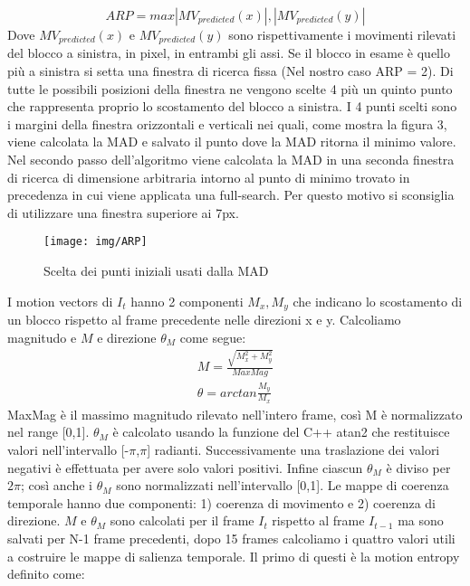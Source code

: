 \documentclass[12pt,oneside]{IEEEtran}
\begin{document}
			\begin{equation}
			ARP = max{|MV_{predicted}(x)|,|MV_{predicted}(y)|}
			\end{equation}
			Dove $MV_{predicted}(x)$ e $MV_{predicted}(y)$ sono rispettivamente i movimenti rilevati del blocco a sinistra, in pixel, in entrambi gli assi. Se il blocco in esame è quello più a sinistra si setta una finestra di ricerca fissa (Nel nostro caso ARP = 2). Di tutte le possibili posizioni della finestra ne vengono scelte 4 più un quinto punto che rappresenta proprio lo scostamento del blocco a sinistra. I 4 punti scelti sono i margini della finestra orizzontali e verticali nei quali, come mostra la figura 3, viene calcolata la MAD e salvato il punto dove la MAD ritorna il minimo valore.\newline
			Nel secondo passo dell'algoritmo viene calcolata la MAD in una seconda finestra di ricerca di dimensione arbitraria intorno al punto di minimo trovato in precedenza in cui viene applicata una full-search. Per questo motivo si sconsiglia di utilizzare una finestra superiore ai 7px.
			\begin{figure}[h]
			\caption{Scelta dei punti iniziali usati dalla MAD}
			\begin{center}
			\texttt{[image: img/ARP]}
			\end{center}
			\end{figure}
			I motion vectors di $I_t$ hanno 2 componenti $M_x,M_y$ che indicano lo scostamento di un blocco rispetto al frame precedente nelle direzioni x e y. Calcoliamo magnitudo e $M$ e direzione $\theta_M$ come segue:\newline
			\begin{equation}
			\begin{aligned}
				M = \frac{\sqrt{M_x^2+M_y^2}}{MaxMag} \\
				\theta = arctan \frac{M_y}{M_x}
			\end{aligned}
			\end{equation}
			MaxMag è il massimo magnitudo rilevato nell'intero frame, così M è normalizzato nel range [0,1]. $\theta_M$ è calcolato usando la funzione del C++ atan2 che restituisce valori nell'intervallo [-$\pi$,$\pi$] radianti. Successivamente una traslazione dei valori negativi è effettuata per avere solo valori positivi. Infine ciascun $\theta_M$ è diviso per $2\pi$; così anche i $\theta_M$ sono normalizzati nell'intervallo [0,1].\newline
			Le mappe di coerenza temporale hanno due componenti: 1) coerenza di movimento e 2) coerenza di direzione. $M$ e $\theta_M$ sono calcolati per il frame $I_t$ rispetto al frame $I_{t-1}$ ma sono salvati per N-1 frame precedenti, dopo 15 frames calcoliamo i quattro valori utili a costruire le mappe di salienza temporale. Il primo di questi è la motion entropy definito come:
\end{document}
